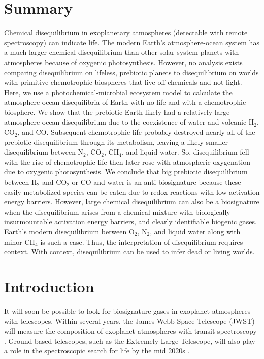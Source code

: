 \section*{\centering Summary}

Chemical disequilibrium in exoplanetary atmospheres (detectable with remote spectroscopy) can indicate life. The modern Earth's atmosphere-ocean system has a much larger chemical disequilibrium than other solar system planets with atmospheres because of oxygenic photosynthesis. However, no analysis exists comparing disequilibrium on lifeless, prebiotic planets to disequilibrium on worlds with primitive chemotrophic biospheres that live off chemicals and not light. Here, we use a photochemical-microbial ecosystem model to calculate the atmosphere-ocean disequilibria of Earth with no life and with a chemotrophic biosphere. We show that the prebiotic Earth likely had a relatively large atmosphere-ocean disequilibrium due to the coexistence of water and volcanic H$_2$, CO$_2$, and CO. Subsequent chemotrophic life probably destroyed nearly all of the prebiotic disequilibrium through its metabolism, leaving a likely smaller disequilibrium between N$_2$, CO$_2$, CH$_4$, and liquid water. So, disequilibrium fell with the rise of chemotrophic life then later rose with atmospheric oxygenation due to oxygenic photosynthesis. We conclude that big prebiotic disequilibrium between H$_2$ and CO$_2$ or CO and water is an anti-biosignature because these easily metabolized species can be eaten due to redox reactions with low activation energy barriers. However, large chemical disequilibrium can also be a biosignature when the disequilibrium arises from a chemical mixture with biologically insurmountable activation energy barriers, and clearly identifiable biogenic gases. Earth's modern disequilibrium between O$_2$, N$_2$, and liquid water along with minor CH$_4$ is such a case. Thus, the interpretation of disequilibrium requires context. With context, disequilibrium can be used to infer dead or living worlds.

\section{Introduction}

It will soon be possible to look for biosignature gases in exoplanet atmospheres with telescopes. Within several years, the James Webb Space Telescope (JWST) will measure the composition of exoplanet atmospheres with transit spectroscopy \citep{Fischer_2019,Gaudi_2019}. Ground-based telescopes, such as the Extremely Large Telescope, will also play a role in the spectroscopic search for life by the mid 2020s \citep{Lopez_2019,Snellen_2013}.

